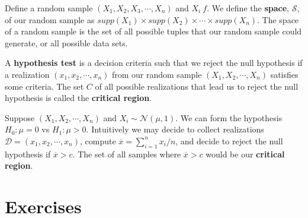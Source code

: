 Define a random sample $(X_{1},X_{2},X_{3},\cdots,X_{n})$ and $X_{i}~f$.
We define the \textbf{space}, $\mathcal{S}$, of our random sample as $supp(X_{1}) \times supp(X_{2}) \times \cdots \times supp(X_{n})$. 
The space of a random sample is the set of all possible tuples that our random sample could generate, or all possible data sets. 

A \textbf{hypothesis test} is a decision criteria such that we reject the null hypothesis if a realization $(x_{1},x_{2},\cdots,x_{n})$ from our random sample $(X_{1},X_{2},\cdots,X_{n})$ satisfies some criteria. 
The set $C$ of all possible realizations that lead us to reject the null hypothesis is called the \textbf{critical region}.

\ex Suppose $(X_{1},X_{2},\cdots,X_{n})$ and $X_{i} \sim \mathcal{N}(\mu,1)$. We can form the hypothesis $H_{0}: \mu=0$ vs $H_{1}: \mu > 0$. Intuitively we may decide to collect realizations $\mathcal{D} = (x_{1},x_{2},\cdots,x_{n})$, compute $\overline{x} = \sum_{i=1}^{n} x_{i} / n$, and decide to reject the null hypothesis if $\overline{x} > c$. The set of all samples where $\overline{x}>c$ would be our \textbf{critical region}.




\section{Exercises}

